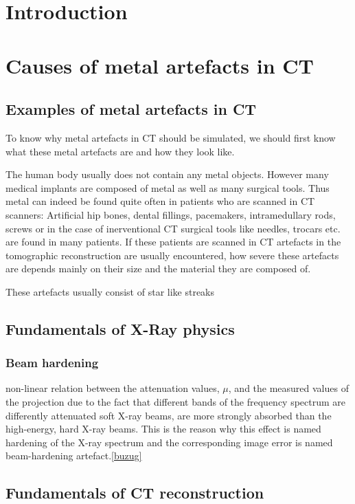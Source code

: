 \chapter{Introduction}

\chapter{Causes of metal artefacts in CT}
\section{Examples of metal artefacts in CT}
\par To know why metal artefacts in CT should be simulated, we should first know what these metal artefacts are and how they look like.
\par The human body usually does not contain any metal objects. However many medical implants are composed of metal as well as many surgical tools. Thus metal can indeed be found quite often in patients who are scanned in CT scanners: Artificial hip bones, dental fillings, pacemakers, intramedullary rods, screws or in the case of inerventional CT surgical tools like needles, trocars etc. are found in many patients. If these patients are scanned in CT artefacts in the tomographic reconstruction are usually encountered, how severe these artefacts are depends mainly on their size and the material they are composed of.
\par These artefacts usually consist of star like streaks 
\section{Fundamentals of X-Ray physics}
\subsection{Beam hardening}
non-linear relation between the attenuation values, \(\mu\), and the measured values of the projection
due to the fact that different bands of the frequency spectrum are differently attenuated
soft X-ray beams, are more strongly absorbed than the high-energy, hard X-ray beams. This is the reason why this effect is named hardening of the X-ray spectrum and the corresponding image error is named beam-hardening artefact.\ref{buzug}
\section{Fundamentals of CT reconstruction}

